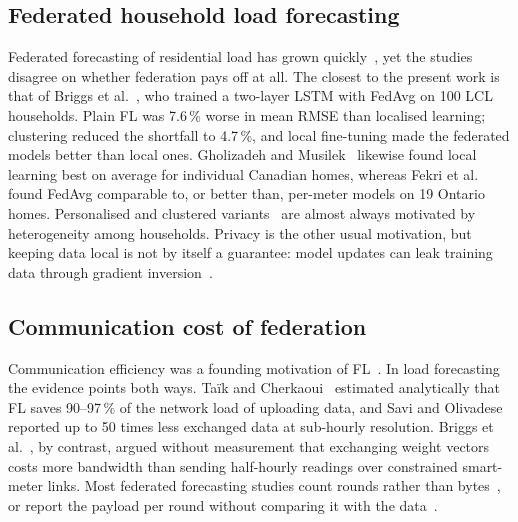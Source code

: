 \subsection{Federated household load forecasting}
Federated forecasting of residential load has grown quickly~\cite{fernndez2022,fekri2022,gholizadeh2022,yang2023,liu2023,fekri2023,qu2023,wang2023,khalil2023,widmer2023,dogra2023,sarmento2024,abdulla2024,singh2024,manzoor2024,mao2024,huang2024,mostafanezhad2025,kaur2025,shao2026,das2026,wang2026,tibermacine2026,he2026,lu2024fds,husnoo2024,he2023hfl,duttagupta2023,rahman2025multihop},
yet the studies disagree on whether federation pays off at all. The closest to the present work is that of Briggs et
al.~\cite{briggs2022}, who trained a two-layer LSTM with FedAvg on 100 LCL households. Plain FL was 7.6\,\% worse in
mean RMSE than localised learning; clustering reduced the shortfall to 4.7\,\%, and local fine-tuning made the federated
models better than local ones. Gholizadeh and Musilek~\cite{gholizadeh2022} likewise found local learning best on
average for individual Canadian homes, whereas Fekri et al.~\cite{fekri2022} found FedAvg comparable to, or better than,
per-meter models on 19 Ontario homes. Personalised and clustered variants~\cite{qu2023,widmer2023,dogra2023,das2026,wang2026,lu2024fds}
are almost always motivated by heterogeneity among households. Privacy is the other usual motivation, but keeping
data local is not by itself a guarantee: model updates can leak training data through gradient
inversion~\cite{zhu2019leakage,geiping2020inverting}.

\subsection{Communication cost of federation}
Communication efficiency was a founding motivation of FL~\cite{mcmahan2017fedavg,konecny2016comm}. In load forecasting
the evidence points both ways. Taïk and Cherkaoui~\cite{taik2020} estimated analytically that FL saves 90--97\,\% of the
network load of uploading data, and Savi and Olivadese~\cite{savi2021} reported up to 50 times less exchanged data at
sub-hourly resolution. Briggs et al.~\cite{briggs2020ccai}, by contrast, argued without measurement that exchanging
weight vectors costs more bandwidth than sending half-hourly readings over constrained smart-meter links. Most
federated forecasting studies count rounds rather than bytes~\cite{fekri2022}, or report the payload per round without
comparing it with the data~\cite{bose2023pl}.


